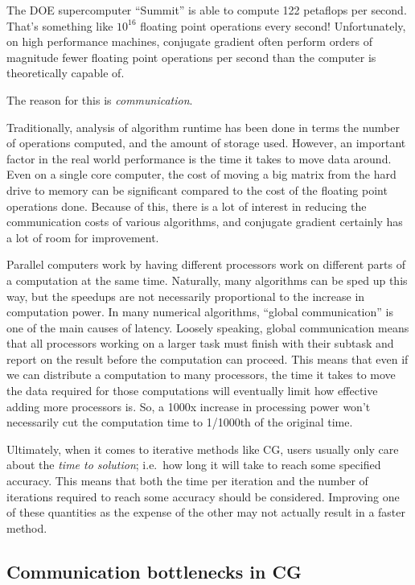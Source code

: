 \documentclass[10pt]{article}
\begin{document}
The DOE supercomputer ``Summit'' is able to compute 122 petaflops per second.
That's something like \(10^{16}\) floating point operations every second!
Unfortunately, on high performance machines, conjugate gradient often perform orders of magnitude fewer floating point operations per second than the computer is theoretically capable of.

The reason for this is \emph{communication}.

Traditionally, analysis of algorithm runtime has been done in terms the number of operations computed, and the amount of storage used.
However, an important factor in the real world performance is the time it takes to move data around.
Even on a single core computer, the cost of moving a big matrix from the hard drive to memory can be significant compared to the cost of the floating point operations done.
Because of this, there is a lot of interest in reducing the communication costs of various algorithms, and conjugate gradient certainly has a lot of room for improvement.

Parallel computers work by having different processors work on different parts of a computation at the same time.
Naturally, many algorithms can be sped up this way, but the speedups are not necessarily proportional to the increase in computation power.
In many numerical algorithms, ``global communication'' is one of the main causes of latency.
Loosely speaking, global communication means that all processors working on a larger task must finish with their subtask and report on the result before the computation can proceed.
This means that even if we can distribute a computation to many processors, the time it takes to move the data required for those computations will eventually limit how effective adding more processors is.
So, a 1000x increase in processing power won't necessarily cut the computation time to 1/1000th of the original time.

Ultimately, when it comes to iterative methods like CG, users usually only care about the \emph{time to solution}; i.e.~how long it will take to reach some specified accuracy.
This means that both the time per iteration and the number of iterations required to reach some accuracy should be considered.
Improving one of these quantities as the expense of the other may not actually result in a faster method.

\subsection{Communication bottlenecks in CG}
\end{document}
